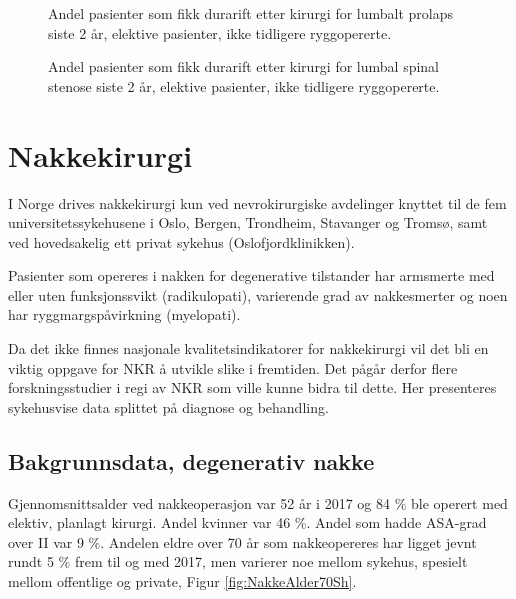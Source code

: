 \begin{figure}[ht]
      \caption{\label{fig:DuraPro} Andel pasienter som fikk durarift etter kirurgi for lumbalt prolaps siste 2 år, 
      elektive pasienter, ikke tidligere ryggopererte.}
      \end{figure}
      
\begin{figure}[ht]
\caption{\label{fig:DuraSS} Andel pasienter som fikk durarift etter kirurgi for lumbal 
                  spinal stenose siste 2 år, elektive pasienter, ikke tidligere ryggopererte.}
\end{figure}

\clearpage



\section{Nakkekirurgi}

I Norge drives nakkekirurgi kun ved nevrokirurgiske avdelinger knyttet til de fem
universitetssykehusene i Oslo, Bergen, Trondheim, Stavanger og Tromsø, samt ved
hovedsakelig ett privat sykehus (Oslofjordklinikken).

Pasienter som opereres i nakken for degenerative tilstander har armsmerte med eller 
uten funksjonssvikt (radikulopati), varierende grad av nakkesmerter og noen har ryggmargspåvirkning (myelopati). 

Da  det ikke finnes nasjonale kvalitetsindikatorer for nakkekirurgi vil det bli en
viktig oppgave for NKR å utvikle slike i fremtiden. Det pågår derfor flere forskningsstudier i regi av NKR som ville kunne bidra til dette. 
Her presenteres sykehusvise data splittet på diagnose og behandling.




\subsection{Bakgrunnsdata, degenerativ nakke}


Gjennomsnittsalder ved nakkeoperasjon var 52 år i 2017 og 84 \% ble operert med elektiv, planlagt kirurgi. Andel kvinner var  46 \%.
Andel som hadde ASA-grad over II var 9 \%. Andelen eldre over 70 år som nakkeopereres har ligget jevnt 
rundt 5 \% frem til og med 2017, men varierer noe mellom sykehus, spesielt mellom offentlige og private, 
Figur \ref{fig:NakkeAlder70Sh}.


